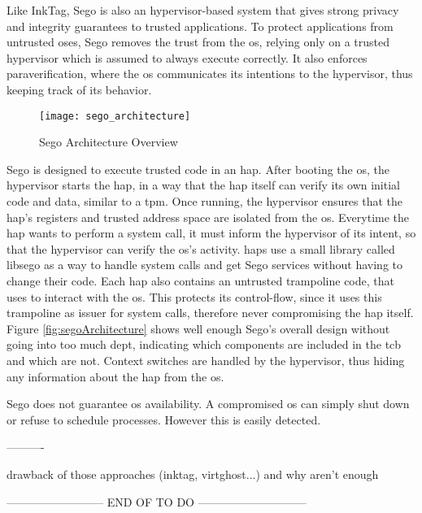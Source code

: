 
Like InkTag, Sego \cite{segoPaper} is also an hypervisor-based system that gives strong privacy and integrity guarantees to trusted applications. To protect applications from untrusted \gls{os}es, Sego removes the trust from the \gls{os}, relying only on a trusted hypervisor which is assumed to always execute correctly. It also enforces paraverification, where the \gls{os} communicates its intentions to the hypervisor, thus keeping track of its behavior.

\begin{figure}[htbp]
	\centering
	{\texttt{[image: sego\_architecture]}}%
	\caption{Sego Architecture Overview}
	\label{segoArchitecture}
\end{figure}

Sego is designed to execute trusted code in an \gls{hap}.
After booting the \gls{os}, the hypervisor starts the \gls{hap}, in a way that the \gls{hap} itself can verify its own initial code and data, similar to a \gls{tpm}.
Once running, the hypervisor ensures that the \gls{hap}’s registers and trusted address space are isolated from the \gls{os}. Everytime the \gls{hap} wants to perform a system call, it must inform
the hypervisor of its intent, so that the hypervisor can verify the \gls{os}'s activity. \gls{hap}s use a
small library called libsego as a way to handle system calls and get Sego services without having to change their code. Each \gls{hap} also contains an untrusted trampoline code, that
uses to interact with the \gls{os}. This protects its control-flow, since it uses this trampoline as issuer for system calls, therefore never compromising the \gls{hap} itself. Figure \ref{fig:segoArchitecture} shows well enough Sego’s overall design without going into too much dept, indicating which components are included in the \gls{tcb} and which are not.
Context switches are handled by the hypervisor, thus hiding any information about the \gls{hap} from the \gls{os}.

Sego does not guarantee \gls{os} availability. A compromised \gls{os} can simply shut down or refuse to schedule processes. However this is easily detected.



----------

			drawback of those approaches (inktag, virtghost...)
			and why aren't enough
			
-------------------------- END OF TO DO -----------------------------

